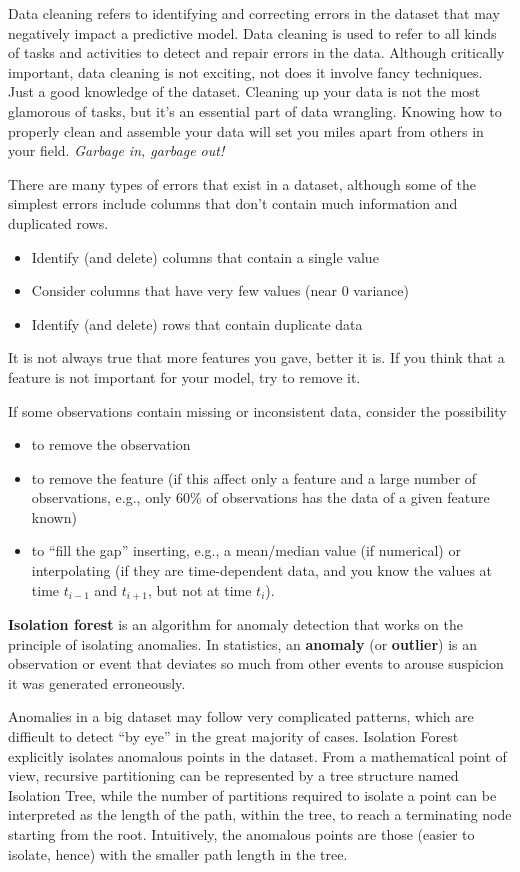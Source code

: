 Data cleaning refers to identifying and correcting errors in the dataset that may negatively impact a predictive model. Data cleaning is used to refer to all kinds of tasks and activities to detect and repair errors in the data. Although critically important, data cleaning is not exciting, not does it involve fancy techniques. Just a good knowledge of the dataset. Cleaning up your data is not the most glamorous of tasks, but it’s an essential part of data wrangling. Knowing how to properly clean and assemble your data will set you miles apart from others in your field. \textit{Garbage in, garbage out!}

There are many types of errors that exist in a dataset, although some of the simplest errors include columns that don’t contain much information and duplicated rows.
\begin{itemize}
    \item Identify (and delete) columns that contain a single value
    \item Consider columns that have very few values (near $0$ variance)
    \item Identify (and delete) rows that contain duplicate data
\end{itemize}

It is not always true that more features you gave, better it is. If you think that a feature is not important for your model, try to remove it.

If some observations contain missing or inconsistent data, consider the possibility
\begin{itemize}
    \item to remove the observation
    \item to remove the feature (if this affect only a feature and a large number of observations, e.g., only 60\% of observations has the data of a given feature known)
    \item to “fill the gap” inserting, e.g., a mean/median value (if numerical) or interpolating (if they are time-dependent data, and you know the values at time $t_{i-1}$ and $t_{i+1}$, but not at time $t_{i}$).
\end{itemize}

\textbf{Isolation forest} is an algorithm for anomaly detection that works on the principle of isolating anomalies. In statistics, an \textbf{anomaly} (or \textbf{outlier}) is an observation or event that deviates so much from other events to arouse suspicion it was generated erroneously.

Anomalies in a big dataset may follow very complicated patterns, which are difficult to detect “by eye” in the great majority of cases. Isolation Forest explicitly isolates anomalous points in the dataset. From a mathematical point of view, recursive partitioning can be represented by a tree structure named Isolation Tree, while the number of partitions required to isolate a point can be interpreted as the length of the path, within the tree, to reach a terminating node starting from the root. Intuitively, the anomalous points are those (easier to isolate, hence) with the smaller path length in the tree.

